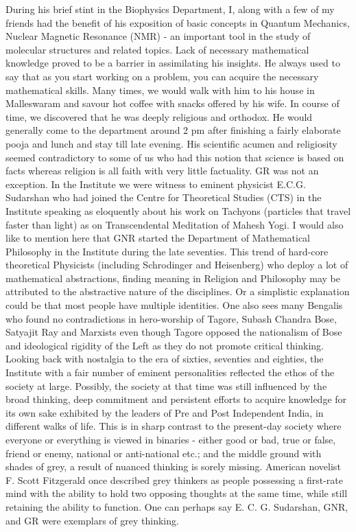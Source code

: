 During his brief stint in the Biophysics Department, I, along with a few of my friends had the benefit of his exposition of basic concepts in Quantum Mechanics, Nuclear Magnetic Resonance (NMR) - an important tool in the study of molecular structures and related topics. Lack of necessary mathematical knowledge proved to be a barrier in assimilating his insights. He always used to say that as you start working on a problem, you can acquire the necessary mathematical skills. Many times, we would walk with him to his house in Malleswaram and savour hot coffee with snacks offered by his wife. In course of time, we discovered that he was deeply religious and orthodox. He would generally come to the department around 2 pm after finishing a fairly elaborate pooja and lunch and stay till late evening. His scientific acumen and religiosity seemed contradictory to some of us who had this notion that science is based on facts whereas religion is all faith with very little factuality. GR was not an exception. In the Institute we were witness to eminent physicist E.C.G. Sudarshan who had joined the Centre for Theoretical Studies (CTS) in the Institute speaking as eloquently about his work on Tachyons (particles that travel faster than light) as on Transcendental Meditation of Mahesh Yogi.  I would also like to mention here that GNR started the Department of Mathematical Philosophy in the Institute during the late seventies. This trend of hard-core theoretical Physicists (including Schrodinger and Heisenberg) who deploy a lot of mathematical abstractions, finding meaning in Religion and Philosophy may be attributed to the abstractive nature of the disciplines. Or a simplistic explanation could be that most people have multiple identities. One also sees many Bengalis who found no contradictions in hero-worship of Tagore, Subash Chandra Bose, Satyajit Ray and Marxists even though Tagore opposed the nationalism of Bose and ideological rigidity of the Left as they do not promote critical thinking. Looking back with nostalgia to the era of sixties, seventies and eighties, the Institute with a fair number of eminent personalities reflected the ethos of the society at large. Possibly, the society at that time was still influenced by the broad thinking, deep commitment and persistent efforts to acquire knowledge for its own sake exhibited by the leaders of Pre and Post Independent India, in different walks of life. This is in sharp contrast to the present-day society where everyone or everything is viewed in binaries - either good or bad, true or false, friend or enemy, national or anti-national etc.; and the middle ground with shades of grey, a result of nuanced thinking is sorely missing.  American novelist F. Scott Fitzgerald once described grey thinkers as people possessing a first-rate mind with the ability to hold two opposing thoughts at the same time, while still retaining the ability to function. One can perhaps say E. C. G. Sudarshan, GNR, and GR were exemplars of grey thinking.

